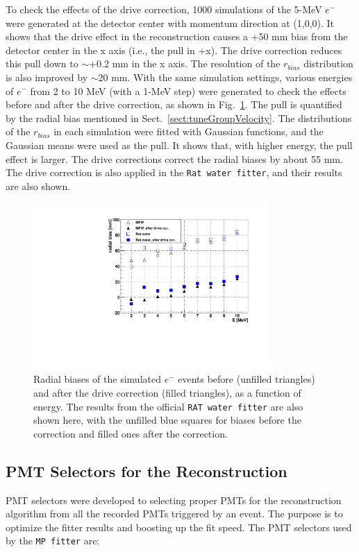 To check the effects of the drive correction, 1000 simulations of the 5-MeV $e^-$ were generated at the detector center with momentum direction at (1,0,0). It shows that the drive effect in the reconstruction causes a +50 mm bias from the detector center in the x axis (i.e., the pull in +x). The drive correction reduces this pull down to $\sim$+0.2 mm in the x axis. The resolution of the $r_{bias}$ distribution is also improved by $\sim$20 mm. With the same simulation settings, various energies of $e^-$ from 2 to 10 MeV (with a 1-MeV step) were generated to check the effects before and after the drive correction, as shown in Fig.~\ref{drivecorVsEnergy}. The pull is quantified by the radial bias mentioned in Sect.~\ref{sect:tuneGroupVelocity}. The distributions of the $r_{bias}$ in each simulation were fitted with Gaussian functions, and the Gaussian means were used as the pull. It shows that, with higher energy, the pull effect is larger. The drive corrections correct the radial biases by about 55 mm. The drive correction is also applied in the \texttt{Rat water fitter}, and their results are also shown.
\begin{figure}[!htb]
	\centering
	\includegraphics[width=9cm]{pullEffectVsEnergy.pdf}
	\caption[Radial biases of the simulated $e^-$ events as a function of energy.]{Radial biases of the simulated $e^-$ events before (unfilled triangles) and after the drive correction (filled triangles), as a function of energy. The results from the official \texttt{RAT water fitter} are also shown here, with the unfilled blue squares for biases before the correction and filled ones after the correction.}
	\label{drivecorVsEnergy}
\end{figure}

\subsection{PMT Selectors for the Reconstruction}\label{sect:PMTselector}
PMT selectors were developed to selecting proper PMTs for the reconstruction algorithm from all the recorded PMTs triggered by an event. The purpose is to optimize the fitter results and boosting up the fit speed. The PMT selectors used by the \texttt{MP fitter} are:

